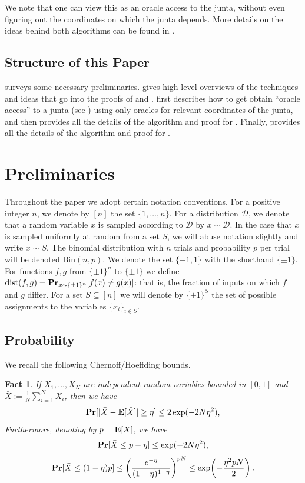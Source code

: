 \documentclass[10pt,a4paper]{article}
\theoremstyle{plain}
\newtheorem{fact}[theorem]{Fact}
\theoremstyle{remark}
\theoremstyle{plain}
\renewcommand{\Pr}{\mathop{\bf Pr\/}}
\providecommand{\E}{}
\renewcommand{\E}{\mathop{\bf E\/}}
\newcommand{\pmone}{\{\pm 1\}}
\newcommand{\calD}{\mathcal{D}}
\newcommand{\dist}{\operatorname{dist}}
\newcommand{\BooleanHypercube}[1]{\{\pm 1\}^{#1}}
\newcommand{\Binomial}{\textrm{Bin}}
\begin{document}
%

We note that one can view this as an oracle access to the junta, without even figuring out the coordinates on which the junta depends. 
 More details on the ideas behind both algorithms can be found in .


 
\subsection{Structure of this Paper}
 surveys some necessary preliminaries.  gives high level overviews of the techniques and ideas that go into the proofs of  and . 
  first describes how to get obtain ``oracle access'' to a junta (see ) using only oracles for relevant coordinates of the junta, and then provides all the details of the algorithm and proof for . Finally,  provides all the details of the algorithm and proof for . 


%
%
%
%
\section{Preliminaries}
\label{section:preliminaries}

Throughout the paper we adopt certain notation conventions. For a positive integer $n$, we denote by $[n]$ the set $\{1,\ldots,n\}$. For a distribution $\calD$, we denote that a random variable $x$ is sampled according to $\calD$ by $x \sim \calD$. In the case that $x$ is sampled uniformly at random from a set $S$, we will abuse notation slightly and write $x \sim S$. 
The binomial distribution with $n$ trials and probability $p$ per trial will be denoted $\Binomial(n,p)$. We denote the set $\{-1,1\}$ with the shorthand $\pmone$. For functions $f,g$ from $\pmone^n$ to $\pmone$ we define $\dist(f,g) = \Pr_{x\sim \pmone^n}[f(x) \neq g(x)]$: that is, the fraction of inputs on which $f$ and $g$ differ. For a set $S \subseteq [n]$ we will denote by $\BooleanHypercube{S}$ the set of possible assignments to the variables $\{x_i\}_{i \in S}$.

\subsection{Probability}
We recall the following Chernoff/Hoeffding bounds.
\begin{fact}
\label{fact:chernoff}
If $X_1,\ldots,X_N$ are independent random variables bounded in $[0,1]$ and $\bar{X} := \frac{1}{N} \sum_{i=1}^N X_i$, then we have
$$\Pr[|\bar{X} - \E[\bar{X}]| \geq \eta] \leq 2 \exp(-2N\eta^2),$$
Furthermore,  denoting by $p = \E[\bar{X}]$, we have 
$$\Pr[\bar{X} \leq p-\eta] \leq  \exp(-2N\eta^2),$$
$$
\Pr[\bar{X} \leq (1-\eta)p] \leq \left (\frac{e^{-\eta}}{(1-\eta)^{1-\eta}}\right)^{pN}\leq \exp\!\left(-\dfrac{\eta^2pN}{2}\right).
$$
\end{fact}
\end{document}
